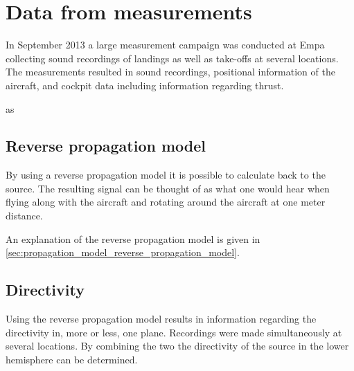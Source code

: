 




\chapter{Data from measurements}
In September 2013 a large measurement campaign was conducted at Empa collecting 
sound recordings of landings as well as take-offs at several 
locations. The measurements resulted in sound recordings, 
positional information of the aircraft, and cockpit data including 
information regarding thrust.

as 

\section{Reverse propagation model}
By using a reverse propagation model it is possible to calculate back to the 
source. The resulting signal can be thought of as what one would hear 
when flying along with the aircraft and rotating around the aircraft at one 
meter distance.

An explanation of the reverse propagation model is given 
in \ref{sec:propagation_model_reverse_propagation_model}.


\section{Directivity}\label{sec:source_synthesiser_directivity}
Using the reverse propagation model results in information regarding 
the directivity in, more or less, one plane.
Recordings were made simultaneously at several locations. By combining the 
two the directivity of the source in the lower hemisphere can be 
determined.


